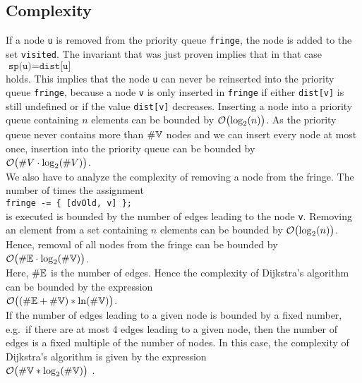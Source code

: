 \subsection{Complexity}
If a node \texttt{u} is removed from the priority queue \texttt{fringe}, the node is added to the set
\texttt{visited}.  The invariant that was just proven implies that in that case
\\[0.2cm]
\hspace*{1.3cm}
$\texttt{sp(u)} = \texttt{dist[u]}$
\\[0.2cm]
holds.  This implies that the node \texttt{u} can never be reinserted into the priority queue
\texttt{fringe}, because a node \texttt{v} is only inserted in \texttt{fringe} if either 
 \texttt{dist[v]} is still undefined or if  the  value \texttt{dist[v]} decreases.  
Inserting a node into a priority queue containing  $n$ elements can be bounded by
$\mathcal{O}\bigl(\log_2(n)\bigr)$.  As the priority queue never contains more than $\#{\mathbb V}$ nodes and we
can insert every node at most once, insertion into the priority queue can be bounded by
\\[0.2cm]
\hspace*{1.3cm}
$\mathcal{O}\bigl(\#V \cdot \log_2(\#V)\bigr)$.
\\[0.2cm]
We also have to analyze the complexity of removing a node from the fringe. 
The number of times the assignment
\\[0.2cm]
\hspace*{1.3cm}
\texttt{fringe -= \{ [dvOld, v] \};} 
\\[0.2cm]
is executed is bounded by the number of edges leading to the node \texttt{v}.
Removing an element from a set containing $n$ elements can be bounded by
 $\mathcal{O}\bigl(\log_2(n)\bigr)$.  Hence, removal of all nodes from the fringe can be bounded by
\\[0.2cm]
\hspace*{1.3cm}
$\mathcal{O}\bigl(\#{\mathbb E} \cdot \log_2(\#{\mathbb V})\bigr)$.
\\[0.2cm]
Here,  $\#{\mathbb E}$ is the number of edges.  Hence the complexity of Dijkstra's algorithm can be
bounded by the expression \\[0.2cm]
\hspace*{1.3cm} $\mathcal{O}\bigl((\#{\mathbb E} + \#{\mathbb V}) * \ln(\#{\mathbb V})\bigr)$. \\[0.2cm]
If the number of edges leading  to a given node is bounded by a fixed number, e.g.~if there
are at most 4 edges leading to a given node, then the number of edges is a fixed multiple of the
number of nodes.  In this case, the complexity of 
 Dijkstra's algorithm is given by the expression  
\\[0.2cm]
\hspace*{1.3cm}
$\mathcal{O}\bigl(\#{\mathbb V} * \log_2(\#{\mathbb V})\bigr)$ .





